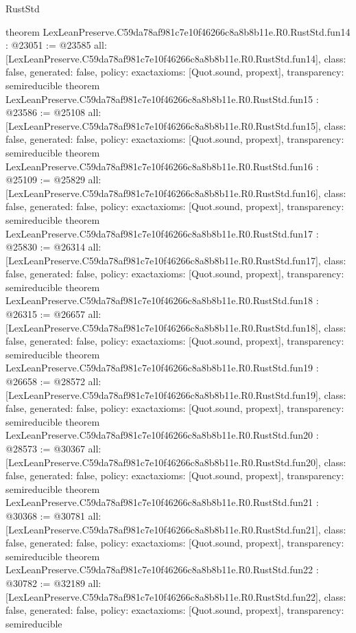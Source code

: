 \begin{lexlean}{RustStd}
\begin{coremodule}
{}
theorem LexLeanPreserve.C59da78af981c7e10f46266c8a8b8b11e.R0.RustStd.fun14 : @23051 := @23585 {
  all: [LexLeanPreserve.C59da78af981c7e10f46266c8a8b8b11e.R0.RustStd.fun14],
  class: false,
  generated: false,
  policy: exact{axioms: [Quot.sound, propext]},
  transparency: semireducible
}
theorem LexLeanPreserve.C59da78af981c7e10f46266c8a8b8b11e.R0.RustStd.fun15 : @23586 := @25108 {
  all: [LexLeanPreserve.C59da78af981c7e10f46266c8a8b8b11e.R0.RustStd.fun15],
  class: false,
  generated: false,
  policy: exact{axioms: [Quot.sound, propext]},
  transparency: semireducible
}
theorem LexLeanPreserve.C59da78af981c7e10f46266c8a8b8b11e.R0.RustStd.fun16 : @25109 := @25829 {
  all: [LexLeanPreserve.C59da78af981c7e10f46266c8a8b8b11e.R0.RustStd.fun16],
  class: false,
  generated: false,
  policy: exact{axioms: [Quot.sound, propext]},
  transparency: semireducible
}
theorem LexLeanPreserve.C59da78af981c7e10f46266c8a8b8b11e.R0.RustStd.fun17 : @25830 := @26314 {
  all: [LexLeanPreserve.C59da78af981c7e10f46266c8a8b8b11e.R0.RustStd.fun17],
  class: false,
  generated: false,
  policy: exact{axioms: [Quot.sound, propext]},
  transparency: semireducible
}
theorem LexLeanPreserve.C59da78af981c7e10f46266c8a8b8b11e.R0.RustStd.fun18 : @26315 := @26657 {
  all: [LexLeanPreserve.C59da78af981c7e10f46266c8a8b8b11e.R0.RustStd.fun18],
  class: false,
  generated: false,
  policy: exact{axioms: [Quot.sound, propext]},
  transparency: semireducible
}
theorem LexLeanPreserve.C59da78af981c7e10f46266c8a8b8b11e.R0.RustStd.fun19 : @26658 := @28572 {
  all: [LexLeanPreserve.C59da78af981c7e10f46266c8a8b8b11e.R0.RustStd.fun19],
  class: false,
  generated: false,
  policy: exact{axioms: [Quot.sound, propext]},
  transparency: semireducible
}
theorem LexLeanPreserve.C59da78af981c7e10f46266c8a8b8b11e.R0.RustStd.fun20 : @28573 := @30367 {
  all: [LexLeanPreserve.C59da78af981c7e10f46266c8a8b8b11e.R0.RustStd.fun20],
  class: false,
  generated: false,
  policy: exact{axioms: [Quot.sound, propext]},
  transparency: semireducible
}
theorem LexLeanPreserve.C59da78af981c7e10f46266c8a8b8b11e.R0.RustStd.fun21 : @30368 := @30781 {
  all: [LexLeanPreserve.C59da78af981c7e10f46266c8a8b8b11e.R0.RustStd.fun21],
  class: false,
  generated: false,
  policy: exact{axioms: [Quot.sound, propext]},
  transparency: semireducible
}
theorem LexLeanPreserve.C59da78af981c7e10f46266c8a8b8b11e.R0.RustStd.fun22 : @30782 := @32189 {
  all: [LexLeanPreserve.C59da78af981c7e10f46266c8a8b8b11e.R0.RustStd.fun22],
  class: false,
  generated: false,
  policy: exact{axioms: [Quot.sound, propext]},
  transparency: semireducible
}
\end{coremodule}
\end{lexlean}
